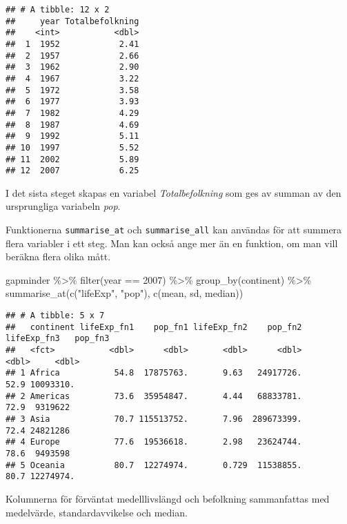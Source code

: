 \documentclass[
]{book}
\newenvironment{Shaded}{\begin{snugshade}}{\end{snugshade}}
\newcommand{\DecValTok}[1]{\textcolor[rgb]{0.00,0.00,0.81}{#1}}
\newcommand{\FunctionTok}[1]{\textcolor[rgb]{0.00,0.00,0.00}{#1}}
\newcommand{\NormalTok}[1]{#1}
\newcommand{\SpecialCharTok}[1]{\textcolor[rgb]{0.00,0.00,0.00}{#1}}
\newcommand{\StringTok}[1]{\textcolor[rgb]{0.31,0.60,0.02}{#1}}
\theoremstyle{definition}
\theoremstyle{definition}
\theoremstyle{definition}
\theoremstyle{definition}
\theoremstyle{remark}
\begin{document}
\begin{verbatim}
## # A tibble: 12 x 2
##     year Totalbefolkning
##    <int>           <dbl>
##  1  1952            2.41
##  2  1957            2.66
##  3  1962            2.90
##  4  1967            3.22
##  5  1972            3.58
##  6  1977            3.93
##  7  1982            4.29
##  8  1987            4.69
##  9  1992            5.11
## 10  1997            5.52
## 11  2002            5.89
## 12  2007            6.25
\end{verbatim}

I det sista steget skapas en variabel \emph{Totalbefolkning} som ges av summan av den ursprungliga variabeln \emph{pop}.

Funktionerna \texttt{summarise\_at} och \texttt{summarise\_all} kan användas för att summera flera variabler i ett steg. Man kan också ange mer än en funktion, om man vill beräkna flera olika mått.

\begin{Shaded}
\begin{Highlighting}[]
\NormalTok{gapminder }\SpecialCharTok{\%\textgreater{}\%} 
  \FunctionTok{filter}\NormalTok{(year }\SpecialCharTok{==} \DecValTok{2007}\NormalTok{) }\SpecialCharTok{\%\textgreater{}\%} 
  \FunctionTok{group\_by}\NormalTok{(continent) }\SpecialCharTok{\%\textgreater{}\%} 
  \FunctionTok{summarise\_at}\NormalTok{(}\FunctionTok{c}\NormalTok{(}\StringTok{"lifeExp"}\NormalTok{, }\StringTok{"pop"}\NormalTok{), }\FunctionTok{c}\NormalTok{(mean, sd, median))}
\end{Highlighting}
\end{Shaded}

\begin{verbatim}
## # A tibble: 5 x 7
##   continent lifeExp_fn1    pop_fn1 lifeExp_fn2    pop_fn2 lifeExp_fn3   pop_fn3
##   <fct>           <dbl>      <dbl>       <dbl>      <dbl>       <dbl>     <dbl>
## 1 Africa           54.8  17875763.       9.63   24917726.        52.9 10093310.
## 2 Americas         73.6  35954847.       4.44   68833781.        72.9  9319622 
## 3 Asia             70.7 115513752.       7.96  289673399.        72.4 24821286 
## 4 Europe           77.6  19536618.       2.98   23624744.        78.6  9493598 
## 5 Oceania          80.7  12274974.       0.729  11538855.        80.7 12274974.
\end{verbatim}

Kolumnerna för förväntat medelllivslängd och befolkning sammanfattas med medelvärde, standardavvikelse och median.
\end{document}
